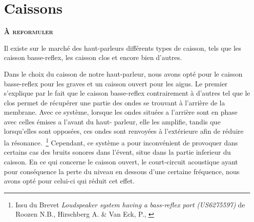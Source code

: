 \section{Caissons}

\textbf{\textsc{À reformuler}}

Il existe sur le marché des haut-parleurs
différents types de caisson, tels que
les caisson basse-reflex, les caisson clos et encore bien d’autres.

Dans le choix du caisson de notre haut-parleur,
nous avons opté pour le caisson basse-reflex pour les graves
et un caisson ouvert pour les aigus.
Le premier s’explique par le fait que le caisson basse-reflex
contrairement à d’autres tel que le clos permet de récupérer
une partie des ondes se trouvant à l’arrière de la membrane.
Avec ce système, lorsque les ondes situées a l’arrière sont en phase
avec celles émises a l’avant du haut- parleur, elle les amplifie,
tandis que lorsqu’elles  sont opposées,
ces ondes sont renvoyées à l’extérieure afin de réduire la résonance.~\footnote{Issu du Brevet \textit{\og Loudspeaker system having a bass-reflex port (US6275597)\fg} de Roozen N.B., Hirschberg A. \& Van Eck, P., \cite{US6275597}}
Cependant, ce système a pour inconvénient de provoquer dans certains cas
des bruits sonores dans l’évent, situe dans la partie inferieur du caisson.
En ce qui concerne le caisson ouvert,
le court-circuit acoustique ayant pour conséquence la perte du niveau
en dessous d’une certaine fréquence,
nous avons opté pour celui-ci qui réduit cet effet.
